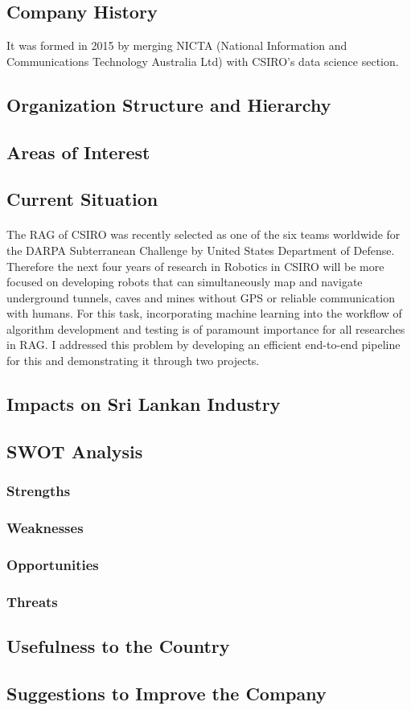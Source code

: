\subsection{Company History}

It was formed in 2015 by merging NICTA (National Information and Communications Technology Australia Ltd) with CSIRO's data science section. 

\subsection{Organization Structure and Hierarchy}
\subsection{Areas of Interest}
\subsection{Current Situation}

\paragraph{}
The RAG of CSIRO was recently selected as one of the six teams worldwide for the DARPA Subterranean Challenge by United States Department of Defense. Therefore the next four years of research in Robotics in CSIRO will be more focused on developing robots that can simultaneously map and navigate underground tunnels, caves and mines without GPS or reliable communication with humans. For this task, incorporating machine learning into the workflow of algorithm development and testing is of paramount importance for all researches in RAG. I addressed this problem by developing an efficient end-to-end pipeline for this and demonstrating it through two projects.

\subsection{Impacts on Sri Lankan Industry}

\subsection{SWOT Analysis}
\subsubsection{Strengths}
\subsubsection{Weaknesses}
\subsubsection{Opportunities}
\subsubsection{Threats}

\subsection{Usefulness to the Country}
\subsection{Suggestions to Improve the Company}